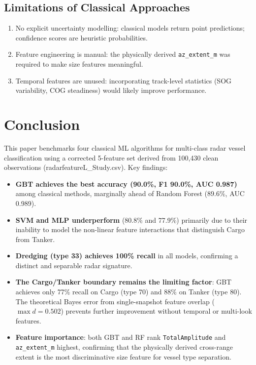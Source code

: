 \documentclass[journal]{IEEEtran}
\begin{document}
\subsection{Limitations of Classical Approaches}

\begin{enumerate}
  \item No explicit uncertainty modelling: classical models return point
        predictions; confidence scores are heuristic probabilities.
  \item Feature engineering is manual: the physically derived
        \texttt{az\_extent\_m} was required to make size features meaningful.
  \item Temporal features are unused: incorporating track-level statistics
        (SOG variability, COG steadiness) would likely improve performance.
\end{enumerate}

\section{Conclusion}

This paper benchmarks four classical ML algorithms for multi-class radar vessel
classification using a corrected 5-feature set derived from 100,430 clean
observations (radarfeatureL\_Study.csv).
Key findings:
\begin{itemize}
  \item \textbf{GBT achieves the best accuracy (90.0\%, F1 90.0\%, AUC 0.987)}
        among classical methods, marginally ahead of Random Forest
        (89.6\%, AUC 0.989).
  \item \textbf{SVM and MLP underperform} (80.8\% and 77.9\%) primarily due to
        their inability to model the non-linear feature interactions that
        distinguish Cargo from Tanker.
  \item \textbf{Dredging (type 33) achieves 100\% recall} in all models,
        confirming a distinct and separable radar signature.
  \item \textbf{The Cargo/Tanker boundary remains the limiting factor}: GBT
        achieves only 77\% recall on Cargo (type 70) and 88\% on Tanker (type 80).
        The theoretical Bayes error from single-snapshot feature overlap
        ($\max d = 0.502$) prevents further improvement without temporal
        or multi-look features.
  \item \textbf{Feature importance}: both GBT and RF rank
        \texttt{TotalAmplitude} and \texttt{az\_extent\_m} highest,
        confirming that the physically derived cross-range extent is the most
        discriminative size feature for vessel type separation.
\end{itemize}
\end{document}
